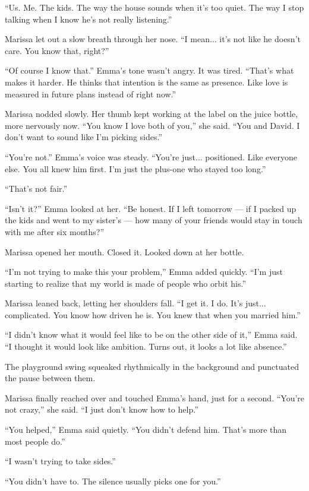 ``Us. Me. The kids. The way the house sounds when it’s too quiet. The way I stop talking when I know 
he’s not really listening.''

Marissa let out a slow breath through her nose. ``I mean... it’s not like he doesn’t care. You know that, 
right?''

``Of course I know that.'' Emma’s tone wasn’t angry. It was tired. ``That’s what makes it harder. He 
thinks that intention is the same as presence. Like love is measured in future plans instead of right 
now.''

Marissa nodded slowly. Her thumb kept working at the label on the juice bottle, more nervously now. 
``You know I love both of you,'' she said. ``You and David. I don’t want to sound like I’m picking 
sides.''

``You’re not.'' Emma’s voice was steady. ``You’re just... positioned. Like everyone else. You all knew 
him first. I’m just the plus-one who stayed too long.''

``That’s not fair.''

``Isn’t it?'' Emma looked at her. ``Be honest. If I left tomorrow — if I packed up the kids and went to 
my sister’s — how many of your friends would stay in touch with me after six months?''

Marissa opened her mouth. Closed it. Looked down at her bottle.

``I’m not trying to make this your problem,'' Emma added quickly. ``I’m just starting to realize that my 
world is made of people who orbit his.''

Marissa leaned back, letting her shoulders fall. ``I get it. I do. It’s just... complicated. You know how 
driven he is. You knew that when you married him.''

``I didn’t know what it would feel like to be on the other side of it,'' Emma said. ``I thought it would 
look like ambition. Turns out, it looks a lot like absence.''

The playground swing squeaked rhythmically in the background and punctuated the pause between them.

Marissa finally reached over and touched Emma’s hand, just for a second. ``You’re not crazy,'' she said. 
``I just don’t know how to help.''

``You helped,'' Emma said quietly. ``You didn’t defend him. That’s more than most people do.''

``I wasn’t trying to take sides.''

``You didn’t have to. The silence usually picks one for you.''

